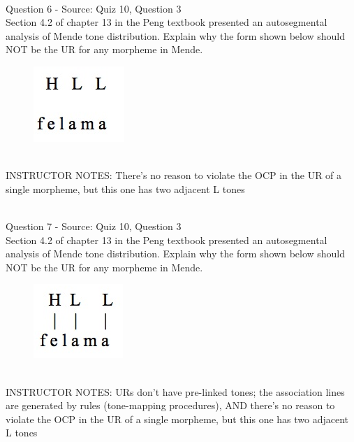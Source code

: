 \documentclass[12pt]{article}
\begin{document}
~\\

{\large Question 6} - Source: Quiz 10, Question 3\\

Section 4.2 of chapter 13 in the Peng textbook presented an autosegmental analysis of Mende tone distribution. Explain why the form shown below should NOT be the UR for any morpheme in Mende.\\

\begin{figure}[H]
\includegraphics{../images/mende_junction_b.png}
\end{figure}

~\\
INSTRUCTOR NOTES: There's no reason to violate the OCP in the UR of a single morpheme, but this one has two adjacent L tones


~\\

{\large Question 7} - Source: Quiz 10, Question 3\\

Section 4.2 of chapter 13 in the Peng textbook presented an autosegmental analysis of Mende tone distribution. Explain why the form shown below should NOT be the UR for any morpheme in Mende.\\

\begin{figure}[H]
\includegraphics{../images/mende_junction_c.png}
\end{figure}

~\\
INSTRUCTOR NOTES: URs don't have pre-linked tones; the association lines are generated by rules (tone-mapping procedures), AND there's no reason to violate the OCP in the UR of a single morpheme, but this one has two adjacent L tones


~\\
\end{document}
